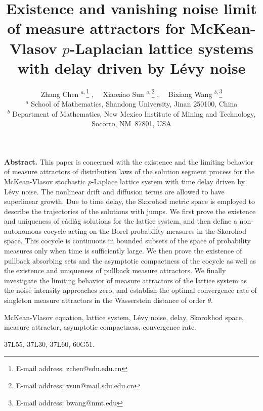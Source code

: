 \documentclass[11pt]{article}
\numberwithin{equation}{section}
\theoremstyle{plain}
\begin{document}
\title{
 {                    \large\bf { 
   Existence and vanishing noise limit of measure attractors for McKean-Vlasov $p$-Laplacian lattice systems with delay driven by L\'{e}vy noise
}}}
 \author{Zhang Chen $^{a,}$\thanks{E-mail address: zchen@sdu.edu.cn} , \ \
        Xiaoxiao Sun $^{a,}$\thanks{E-mail address: xsun@mail.sdu.edu.cn} , \ \
        Bixiang Wang $^{b,}$\thanks{E-mail address: bwang@nmt.edu}       
\\
\normalsize{$^a$ School of Mathematics, Shandong University, Jinan 250100,  China} \\
\normalsize{$^b$ Department of Mathematics, New Mexico Institute of Mining and Technology,} \\
\normalsize{Socorro,  NM~87801, USA}\\
}
\date{}
\maketitle

\begin{minipage}{14cm}
{\bf Abstract.}
 This paper is concerned with the existence and
 the  limiting behavior of
 measure attractors
 of distribution laws of 
 the  
 solution segment process  for
 the  McKean-Vlasov stochastic $p$-Laplace lattice system
 with time delay
 driven by    L\'{e}vy noise.
 The nonlinear drift and  diffusion terms are
 allowed to have
  superlinear growth.
  Due to time delay,
  the Skorohod metric space
  is employed to
  describe the trajectories
  of the solutions
  with jumps. 
 We first prove the
 existence and uniqueness
 of  c\`{a}dl\`{a}g solutions for the lattice system,
 and then define a   non-autonomous cocycle
 acting on the Borel
 probability measures
 in the Skorohod space.
 This cocycle is continuous
 in bounded subsets
 of the space of probability
 measures only when time is
 sufficiently large.
 We then prove the existence
 of pullback absorbing sets
 and the asymptotic compactness
 of the cocycle as well as
 the existence and uniqueness
 of pullback 
 measure attractors.
 We finally investigate
 the limiting behavior
 of 
 measure
  attractors
 of the lattice system
 as the noise intensity approaches zero,
 and establish the 
     optimal convergence rate of singleton measure attractors in
     the  Wasserstein distance 
      of order $\theta$.
 
\vspace{2mm}

 McKean-Vlasov equation, lattice system, L\'{e}vy noise, delay, Skorokhod space, measure attractor, asymptotic compactness, convergence rate.

\vspace{2mm}

37L55,  %
37L30, %
37L60, %
60G51. %
\end{minipage}
\end{document}
